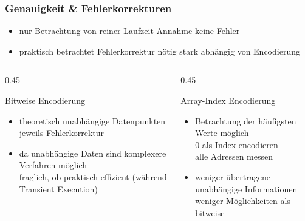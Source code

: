 \begin{frame}
    \frametitle{Genauigkeit \& Fehlerkorrekturen}

    \begin{itemize}
        \item nur Betrachtung von reiner Laufzeit \textrightarrow\space Annahme keine Fehler
        \item praktisch betrachtet Fehlerkorrektur nötig \textrightarrow\space stark abhängig von Encodierung
    \end{itemize}

    \pause

    \begin{columns}[t]
        \begin{column}{0.45\textwidth}
            \begin{block}{Bitweise Encodierung}
                \begin{itemize}
                    \item theoretisch unabhängige Datenpunkten\\
                    \textrightarrow\space jeweils Fehlerkorrektur
                    \item da unabhängige Daten sind komplexere Verfahren möglich\\
                    \textrightarrow\space fraglich, ob praktisch effizient (während Transient Execution)
                \end{itemize}
            \end{block}
        \end{column}
        \pause
        \begin{column}{0.45\textwidth}
            \begin{block}{Array-Index Encodierung}
                \begin{itemize}
                    \item Betrachtung der häufigsten Werte möglich\\
                    \textrightarrow\space $0$ als Index encodieren\\
                    \textrightarrow\space alle Adressen messen
                    \item weniger übertragene unabhängige Informationen\\
                    \textrightarrow\space weniger Möglichkeiten als bitweise
                \end{itemize}
            \end{block}
        \end{column}
    \end{columns}


\end{frame}
